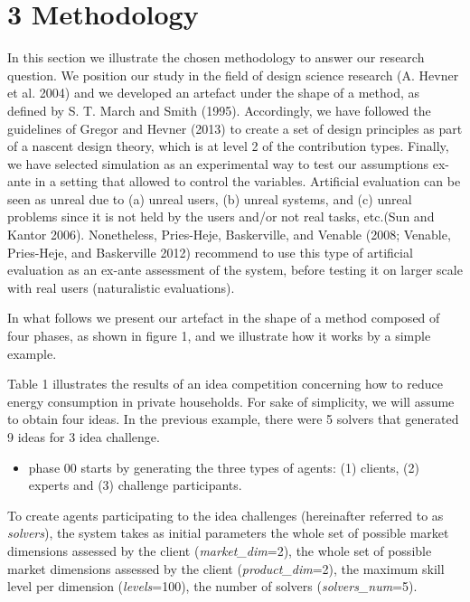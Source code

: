 \documentclass[]{elsarticle} %
\providecommand{\tightlist}{%
  \setlength{\itemsep}{0pt}\setlength{\parskip}{0pt}}
\begin{document}
\section{3 Methodology}\label{methodology}

In this section we illustrate the chosen methodology to answer our
research question. We position our study in the field of design science
research (A. Hevner et al. 2004) and we developed an artefact under the
shape of a method, as defined by S. T. March and Smith (1995).
Accordingly, we have followed the guidelines of Gregor and Hevner (2013)
to create a set of design principles as part of a nascent design theory,
which is at level 2 of the contribution types. Finally, we have selected
simulation as an experimental way to test our assumptions ex-ante in a
setting that allowed to control the variables. Artificial evaluation can
be seen as unreal due to (a) unreal users, (b) unreal systems, and (c)
unreal problems since it is not held by the users and/or not real tasks,
etc.(Sun and Kantor 2006). Nonetheless, Pries-Heje, Baskerville, and
Venable (2008; Venable, Pries-Heje, and Baskerville 2012) recommend to
use this type of artificial evaluation as an ex-ante assessment of the
system, before testing it on larger scale with real users (naturalistic
evaluations).

In what follows we present our artefact in the shape of a method
composed of four phases, as shown in figure 1, and we illustrate how it
works by a simple example.

Table 1 illustrates the results of an idea competition concerning how to
reduce energy consumption in private households. For sake of simplicity,
we will assume to obtain four ideas. In the previous example, there were
5 solvers that generated 9 ideas for 3 idea challenge.

\begin{itemize}
\tightlist
\item
  phase 00 starts by generating the three types of agents: (1) clients,
  (2) experts and (3) challenge participants.
\end{itemize}

To create agents participating to the idea challenges (hereinafter
referred to as \emph{solvers}), the system takes as initial parameters
the whole set of possible market dimensions assessed by the client
(\emph{market\_dim}=2), the whole set of possible market dimensions
assessed by the client (\emph{product\_dim}=2), the maximum skill level
per dimension (\emph{levels}=100), the number of solvers
(\emph{solvers\_num}=5).
\end{document}
